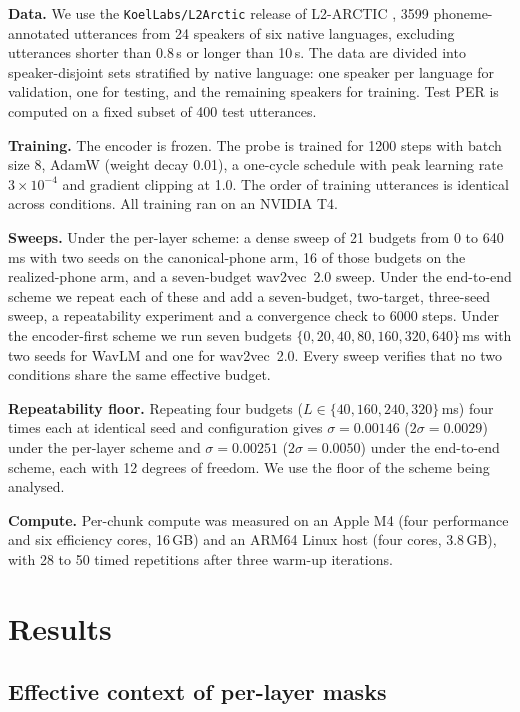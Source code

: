 \documentclass[preprint,12pt,authoryear]{elsarticle}
\begin{document}
\textbf{Data.} We use the \texttt{KoelLabs/L2Arctic} release of
L2-ARCTIC \citep{l2arctic2018}, 3599 phoneme-annotated utterances from 24
speakers of six native languages, excluding utterances shorter than 0.8\,s or
longer than 10\,s. The data are divided into speaker-disjoint sets stratified
by native language: one speaker per language for validation, one for testing,
and the remaining speakers for training. Test PER is computed on a fixed
subset of 400 test utterances.

\textbf{Training.} The encoder is frozen. The probe is trained for 1200 steps
with batch size 8, AdamW (weight decay 0.01), a one-cycle schedule with peak
learning rate $3\times10^{-4}$ and gradient clipping at 1.0. The order of
training utterances is identical across conditions. All training ran on an
NVIDIA T4.

\textbf{Sweeps.} Under the per-layer scheme: a dense sweep of 21 budgets from
0 to 640\,ms with two seeds on the canonical-phone arm, 16 of those budgets on
the realized-phone arm, and a seven-budget wav2vec~2.0 sweep. Under the
end-to-end scheme we repeat each of these and add a seven-budget,
two-target, three-seed sweep, a repeatability experiment and a convergence
check to 6000 steps. Under the encoder-first scheme we run seven budgets
$\{0,20,40,80,160,320,640\}$\,ms with two seeds for WavLM and one for
wav2vec~2.0. Every sweep verifies that no two conditions share the same
effective budget.

\textbf{Repeatability floor.} Repeating four budgets
($L\in\{40,160,240,320\}$\,ms) four times each at identical seed and
configuration gives $\sigma=0.00146$ ($2\sigma=0.0029$) under the per-layer
scheme and $\sigma=0.00251$ ($2\sigma=0.0050$) under the end-to-end scheme,
each with 12 degrees of freedom. We use the floor of the scheme being
analysed.

\textbf{Compute.} Per-chunk compute was measured on an Apple M4 (four
performance and six efficiency cores, 16\,GB) and an ARM64 Linux host (four
cores, 3.8\,GB), with 28 to 50 timed repetitions after three warm-up
iterations.

\section{Results}
\label{sec:results}

\subsection{Effective context of per-layer masks}
\label{sec:reach}
\end{document}
